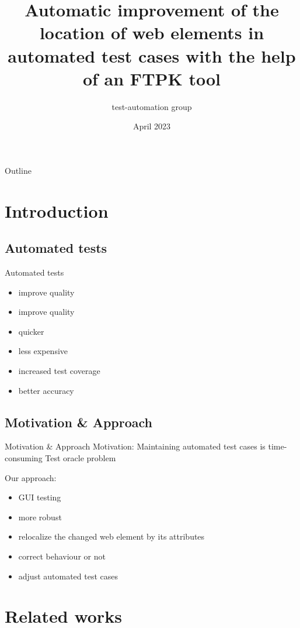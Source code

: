 \documentclass{beamer}
\title{Automatic improvement of the location of web elements in automated test cases with the help of an FTPK tool}
\subtitle{}
\author{test-automation group}
\institute{ELTE}
\date{April 2023}
\begin{document}
\begin{frame}
\titlepage
\end{frame}

\begin{frame}{Outline}
\tableofcontents
\end{frame}

\section{Introduction}

\subsection{Automated tests}
\begin{frame}{Automated tests}
\begin{itemize}
    \item improve quality
    \item improve quality
    \item quicker
    \item less expensive
    \item increased test coverage
    \item better accuracy
\end{itemize}
\end{frame}

\subsection{Motivation \& Approach}
\begin{frame}{Motivation \& Approach}
Motivation: 
Maintaining automated test cases is time-consuming
Test oracle problem

Our approach:
\begin{itemize}
    \item GUI testing
    \item more robust
    \item relocalize the changed web element by its attributes
    \item correct behaviour or not
    \item adjust automated test cases
\end{itemize}
\end{frame}

\section{Related works}
\end{document}
